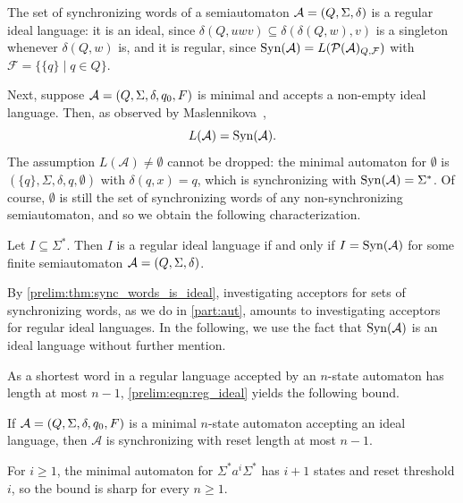 
The set of synchronizing words of a semiautomaton
$\mathcal A = (Q, \Sigma, \delta)$ is a regular ideal language:
it is an ideal, since $\delta(Q, uwv) \subseteq \delta(\delta(Q,w), v)$
is a singleton whenever $\delta(Q,w)$ is, and it is regular, since
$\operatorname{Syn}(\mathcal A) = L(\mathcal P(\mathcal A)_{Q, \mathcal F})$
with $\mathcal F = \{ \{q\} \mid q \in Q \}$.

Next, suppose $\mathcal A = (Q, \Sigma, \delta, q_0, F)$ is minimal and accepts a
{non-empty} ideal language. Then, as observed by
Maslennikova~\cite{DBLP:journals/corr/Maslennikova14,DBLP:journals/ijfcs/Maslennikova19},
\begin{equation}\label{prelim:eqn:reg_ideal}
	L(\mathcal A) = \operatorname{Syn}(\mathcal A).
\end{equation}
The assumption $L(\mathcal A) \ne \emptyset$ cannot be dropped: the minimal
automaton for $\emptyset$ is $(\{q\}, \Sigma, \delta, q, \emptyset)$ with
$\delta(q,x) = q$, which is synchronizing with $\operatorname{Syn}(\mathcal A) = \Sigma^*$.
Of course, $\emptyset$ is still the set of synchronizing words of any
non-synchronizing semiautomaton, and so we obtain the following
characterization.

\begin{theorem}
	\label{prelim:thm:sync_words_is_ideal}
	Let $I \subseteq \Sigma^*$. Then $I$ is a regular ideal language if and only
	if $I = \operatorname{Syn}(\mathcal A)$ for some finite semiautomaton
	$\mathcal A = (Q, \Sigma, \delta)$.
\end{theorem}

By \cref{prelim:thm:sync_words_is_ideal}, investigating acceptors for sets of
synchronizing words, as we do in \cref{part:aut}, amounts to investigating
acceptors for regular ideal languages. In the following, we use the fact that
$\operatorname{Syn}(\mathcal A)$ is an ideal language without further mention.

As a shortest word in a regular language accepted by an $n$-state
automaton has length at most $n-1$, \cref{prelim:eqn:reg_ideal} yields the
following bound.

\begin{proposition}
	\label{prelim:prop:reset_length_ideal}
	If $\mathcal A = (Q, \Sigma, \delta, q_0, F)$ is a minimal $n$-state automaton
	accepting an ideal language, then $\mathcal A$ is synchronizing with reset
	length at most $n-1$.
\end{proposition}

For $i \ge 1$, the minimal automaton for $\Sigma^* a^i \Sigma^*$ has $i+1$ states
and reset threshold $i$, so the bound is sharp for every $n \ge 1$.